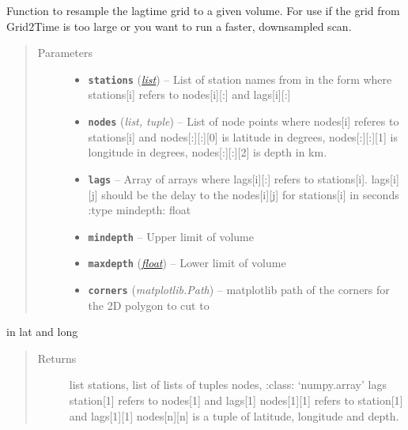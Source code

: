 \documentclass[a4paper,10pt,english]{sphinxmanual}
\begin{document}
\begin{fulllineitems}
\label{modules:bright_lights._resample_grid}
Function to resample the lagtime grid to a given volume.  For use if the
grid from Grid2Time is too large or you want to run a faster, downsampled
scan.
\begin{quote}\begin{description}
\item[{Parameters}] \leavevmode\begin{itemize}
\item {} 
\textbf{\texttt{stations}} (\href{https://docs.python.org/library/functions.html\#list}{\emph{list}}) -- List of station names from in the form where stations{[}i{]}    refers to nodes{[}i{]}{[}:{]} and lags{[}i{]}{[}:{]}

\item {} 
\textbf{\texttt{nodes}} (\emph{list, tuple}) -- List of node points where nodes{[}i{]} referes to stations{[}i{]} and    nodes{[}:{]}{[}:{]}{[}0{]} is latitude in degrees, nodes{[}:{]}{[}:{]}{[}1{]} is longitude in    degrees, nodes{[}:{]}{[}:{]}{[}2{]} is depth in km.

\item {} 
\textbf{\texttt{lags}} -- Array of arrays where lags{[}i{]}{[}:{]} refers to stations{[}i{]}.    lags{[}i{]}{[}j{]} should be the delay to the nodes{[}i{]}{[}j{]} for stations{[}i{]} in seconds    :type mindepth: float

\item {} 
\textbf{\texttt{mindepth}} -- Upper limit of volume

\item {} 
\textbf{\texttt{maxdepth}} (\href{https://docs.python.org/library/functions.html\#float}{\emph{float}}) -- Lower limit of volume

\item {} 
\textbf{\texttt{corners}} (\emph{matplotlib.Path}) -- matplotlib path of the corners for the 2D polygon to cut to

\end{itemize}

\end{description}\end{quote}

in lat and long
\begin{quote}\begin{description}
\item[{Returns}] \leavevmode
list stations, list of lists of tuples nodes, :class:     `numpy.array' lags station{[}1{]} refers to nodes{[}1{]} and lags{[}1{]}    nodes{[}1{]}{[}1{]} refers to station{[}1{]} and lags{[}1{]}{[}1{]}    nodes{[}n{]}{[}n{]} is a tuple of latitude, longitude and depth.

\end{description}\end{quote}

\end{fulllineitems}
\end{document}
